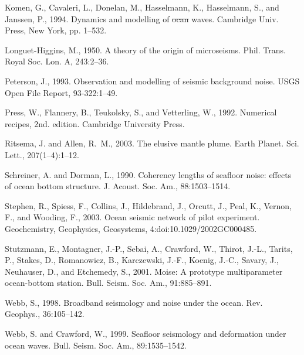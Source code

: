 \documentclass{article}
\providecommand{\DIFadd}[1]{{\protect\color{blue}\uwave{#1}}} %
\providecommand{\DIFdel}[1]{{\protect\color{red}\sout{#1}}}                      %
\providecommand{\DIFaddbegin}{} %
\providecommand{\DIFaddend}{} %
\providecommand{\DIFdelbegin}{} %
\providecommand{\DIFdelend}{} %
\begin{document}
{\begin{thebibliography}{}
Komen, G., Cavaleri, L., Donelan, M., Hasselmann, K., Hasselmann, S., and
  Janssen, P., 1994.
\newblock Dynamics and modelling of \DIFdelbegin \DIFdel{ocan }\DIFdelend \DIFaddbegin \DIFadd{ocean }\DIFaddend waves.
\newblock Cambridge Univ. Press, New York, pp. 1--532.

Longuet-Higgins, M., 1950.
\newblock A theory of the origin of microseisms.
\newblock Phil. Trans. Royal Soc. Lon. A, 243:2--36.

Peterson, J., 1993.
\newblock Observation and modelling of seismic background noise.
\newblock USGS Open File Report, 93-322:1--49.

Press, W., Flannery, B., Teukolsky, S., and Vetterling, W., 1992.
\newblock Numerical recipes, 2nd. edition.
\newblock Cambridge University Press.

Ritsema, J. and Allen, R.~M., 2003.
\newblock The elusive mantle plume.
\newblock Earth Planet. Sci. Lett., 207(1--4):1--12.

Schreiner, A. and Dorman, L., 1990.
\newblock Coherency lengths of seafloor noise: effects of ocean bottom
  structure.
\newblock J. Acoust. Soc. Am., 88:1503--1514.

Stephen, R., Spiess, F., Collins, J., Hildebrand, J., Orcutt, J., Peal, K.,
  Vernon, F., and Wooding, F., 2003.
\newblock Ocean seismic network of pilot experiment.
\newblock Geochemistry, Geophysics, Geosystems, 4:doi:10.1029/2002GC000485.

Stutzmann, E., Montagner, J.-P., Sebai, A., Crawford, W., Thirot, J.-L.,
  Tarits, P., Stakes, D., Romanowicz, B., Karczewski, J.-F., Koenig, J.-C.,
  Savary, J., Neuhauser, D., and Etchemedy, S., 2001.
\newblock Moise: A prototype multiparameter ocean-bottom station.
\newblock Bull. Seism. Soc. Am., 91:885--891.

Webb, S., 1998.
\newblock Broadband seismology and noise under the ocean.
\newblock Rev. Geophys., 36:105--142.

Webb, S. and Crawford, W., 1999.
\newblock Seafloor seismology and deformation under ocean waves.
\newblock Bull. Seism. Soc. Am., 89:1535--1542.


\end{thebibliography}}
\end{document}
